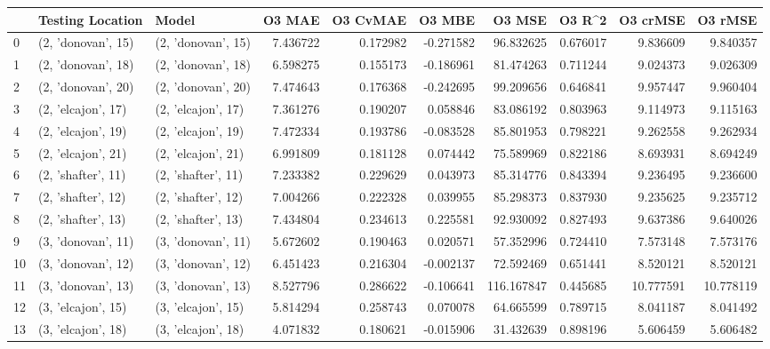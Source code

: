 \begin{tabular}{lllrrrrrrr}
\toprule
{} &    Testing Location &               Model &    O3 MAE &  O3 CvMAE &    O3 MBE &      O3 MSE &    O3 R\textasciicircum2 &   O3 crMSE &    O3 rMSE \\
\midrule
0  &  (2, 'donovan', 15) &  (2, 'donovan', 15) &  7.436722 &  0.172982 & -0.271582 &   96.832625 &  0.676017 &   9.836609 &   9.840357 \\
1  &  (2, 'donovan', 18) &  (2, 'donovan', 18) &  6.598275 &  0.155173 & -0.186961 &   81.474263 &  0.711244 &   9.024373 &   9.026309 \\
2  &  (2, 'donovan', 20) &  (2, 'donovan', 20) &  7.474643 &  0.176368 & -0.242695 &   99.209656 &  0.646841 &   9.957447 &   9.960404 \\
3  &  (2, 'elcajon', 17) &  (2, 'elcajon', 17) &  7.361276 &  0.190207 &  0.058846 &   83.086192 &  0.803963 &   9.114973 &   9.115163 \\
4  &  (2, 'elcajon', 19) &  (2, 'elcajon', 19) &  7.472334 &  0.193786 & -0.083528 &   85.801953 &  0.798221 &   9.262558 &   9.262934 \\
5  &  (2, 'elcajon', 21) &  (2, 'elcajon', 21) &  6.991809 &  0.181128 &  0.074442 &   75.589969 &  0.822186 &   8.693931 &   8.694249 \\
6  &  (2, 'shafter', 11) &  (2, 'shafter', 11) &  7.233382 &  0.229629 &  0.043973 &   85.314776 &  0.843394 &   9.236495 &   9.236600 \\
7  &  (2, 'shafter', 12) &  (2, 'shafter', 12) &  7.004266 &  0.222328 &  0.039955 &   85.298373 &  0.837930 &   9.235625 &   9.235712 \\
8  &  (2, 'shafter', 13) &  (2, 'shafter', 13) &  7.434804 &  0.234613 &  0.225581 &   92.930092 &  0.827493 &   9.637386 &   9.640026 \\
9  &  (3, 'donovan', 11) &  (3, 'donovan', 11) &  5.672602 &  0.190463 &  0.020571 &   57.352996 &  0.724410 &   7.573148 &   7.573176 \\
10 &  (3, 'donovan', 12) &  (3, 'donovan', 12) &  6.451423 &  0.216304 & -0.002137 &   72.592469 &  0.651441 &   8.520121 &   8.520121 \\
11 &  (3, 'donovan', 13) &  (3, 'donovan', 13) &  8.527796 &  0.286622 & -0.106641 &  116.167847 &  0.445685 &  10.777591 &  10.778119 \\
12 &  (3, 'elcajon', 15) &  (3, 'elcajon', 15) &  5.814294 &  0.258743 &  0.070078 &   64.665599 &  0.789715 &   8.041187 &   8.041492 \\
13 &  (3, 'elcajon', 18) &  (3, 'elcajon', 18) &  4.071832 &  0.180621 & -0.015906 &   31.432639 &  0.898196 &   5.606459 &   5.606482 \\

\end{tabular}
